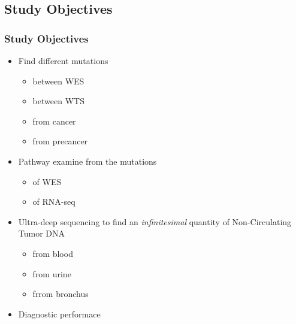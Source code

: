 \documentclass{beamer}
\begin{document}
    \subsection{Study Objectives}
    \begin{frame}
        \frametitle{Study Objectives}

        \begin{itemize}
            \item Find different mutations
            \begin{itemize}
                \item between WES
                \item between WTS
            \end{itemize}
            \begin{itemize}
                \item from cancer
                \item from precancer
            \end{itemize}

            \item Pathway examine from the mutations
            \begin{itemize}
                \item of WES
                \item of RNA-seq
            \end{itemize}

            \item Ultra-deep sequencing to find an \textit{infinitesimal} quantity of Non-Circulating Tumor DNA
            \begin{itemize}
                \item from blood
                \item from urine
                \item frrom bronchus
            \end{itemize}

            \item Diagnostic performace
        \end{itemize}
    \end{frame}
\end{document}
